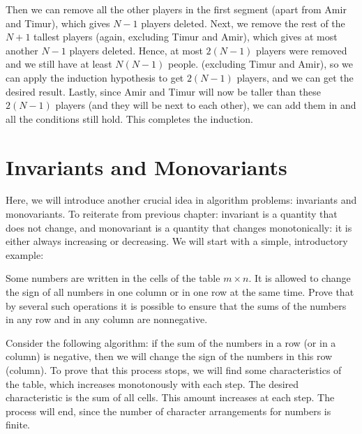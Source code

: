 Then we can remove all the other players in the first segment (apart from Amir and Timur), which gives $N-1$ players deleted. Next, we remove the rest of the $N+1$ tallest players (again, excluding Timur and Amir), which gives at most another $N-1$ players deleted. Hence, at most $2(N-1)$ players were removed and we still have at least $N(N-1)$ people. (excluding Timur and Amir), so we can apply the induction hypothesis to get $2(N-1)$ players, and we can get the desired result. Lastly, since Amir and Timur will now be taller than these $2(N-1)$ players (and they will be next to each other), we can add them in and all the conditions still hold. This completes the induction.

\newpage

\section{Invariants and Monovariants}

Here, we will introduce another crucial idea in algorithm problems: invariants and monovariants. To reiterate from previous chapter: invariant is a quantity that does not change, and monovariant is a quantity that changes monotonically: it is either always increasing or decreasing. We will start with a simple, introductory example: 

\begin{example}
    Some numbers are written in the cells of the table $m \times n$. It is allowed to change the sign of all numbers in one column or in one row at the same time. Prove that by several such operations it is possible to ensure that the sums of the numbers in any row and in any column are nonnegative.
\end{example}

\sol Consider the following algorithm: if the sum of the numbers in a row (or in a column) is negative, then we will change the sign of the numbers in this row (column). To prove that this process stops, we will find some characteristics of the table, which increases monotonously with each step. The desired characteristic is the sum of all cells. This amount increases at each step. The process will end, since the number of character arrangements for numbers is finite.

